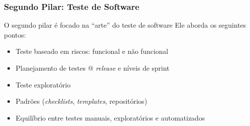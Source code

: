 \documentclass[
	12pt,				%
	openright,			%
	oneside,			%
	a4paper,			%
	english,			%
	brazil,				%
	]{abntex2}
\begin{document}
\subsubsection{Segundo Pilar: Teste de Software}
O segundo pilar é focado na ``arte'' do teste de software
Ele aborda os seguintes pontos:
\begin{itemize}
    \item Teste baseado em riscos: funcional e não funcional
    \item Planejamento de testes @ \emph{release} e níveis de sprint %
    \item Teste exploratório
    \item Padrões (\emph{checklists}, \emph{templates}, repositórios)
    \item Equilíbrio entre testes manuais, exploratórios e automatizados
\end{itemize}


\end{document}
